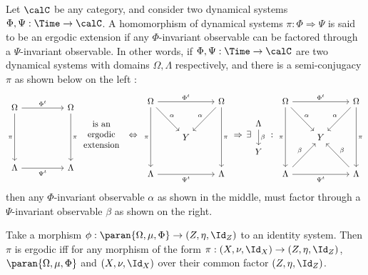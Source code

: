 \documentclass[12pt,oneside,pb-diagram]{article}
\begin{document}
\begin{definition} 
	Let $\calC$ be any category, and consider two dynamical systems $\Phi, \Psi : \Time \to \calC$. A homomorphism of dynamical systems $\pi : \Phi \Rightarrow \Psi$ is said to be an ergodic extension if any $\Phi$-invariant observable can be factored through a $\Psi$-invariant observable. In other words, if $\Phi, \Psi : \Time \to \calC$ are two dynamical systems with domains $\Omega, \Lambda$ respectively, and there is a semi-conjugacy $\pi$ as shown below on the left :
	\begin{equation} \label{eqn:def:erg_extn}
		\begin{tikzcd} [row sep = large]
			\Omega \arrow[dd, "\pi"'] \arrow[rr, "\Phi^t"] & & \Omega \arrow[dd, "\pi"] \\
			\\
			\Lambda \arrow[rr, "\Psi^t"'] & & \Lambda
		\end{tikzcd}
		\begin{array}{c} \mbox{is an} \\ \mbox{ergodic} \\ \mbox{extension} \end{array}
		\;\Leftrightarrow\;
		\begin{tikzcd} [row sep = large]
			\Omega \arrow[dr, "\alpha"] \arrow[dd, "\pi"'] \arrow[rr, "\Phi^t"] & & \Omega \arrow[dd, "\pi"] \arrow[dl, "\alpha"'] \\
			& Y\\
			\Lambda \arrow[rr, "\Psi^t"'] & & \Lambda
		\end{tikzcd} 
		\,\Rightarrow\,
		\exists \begin{tikzcd} \Lambda \arrow[d, "\beta"] \\ Y \end{tikzcd} \,:\,
		\begin{tikzcd} [row sep = large]
			\Omega \arrow[dr, "\alpha"] \arrow[dd, "\pi"'] \arrow[rr, "\Phi^t"] & & \Omega \arrow[dd, "\pi"] \arrow[dl, "\alpha"'] \\
			& Y\\
			\Lambda \arrow[ur, "\beta"] \arrow[rr, "\Psi^t"'] & & \Lambda \arrow[ul, "\beta"']
		\end{tikzcd} 
	\end{equation}
	then any $\Phi$-invariant observable $\alpha$ as shown in the middle, must factor through a $\Psi$-invariant observable $\beta$ as shown on the right.
\end{definition} 

\begin{lemma}  \label{lem:0dj9xc}
	\cite[Lem 6.24]{glasner2015join} Take a morphism $\phi : \paran{\Omega, \mu, \Phi} \to (Z, \eta, \Id_Z)$ to an identity system. Then $\pi$ is ergodic iff for any morphism of the form $\pi : (X, \nu, \Id_X) \to (Z, \eta, \Id_Z)$, $\paran{\Omega, \mu, \Phi}$ and $(X, \nu, \Id_X)$ over their common factor $(Z, \eta, \Id_Z)$.
\end{lemma}
\end{document}
